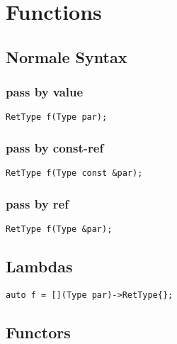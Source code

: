 \section{Functions}
\label{Function}

\subsection{Normale Syntax}
\subsubsection{pass by value}
\begin{lstlisting}
RetType f(Type par);
\end{lstlisting}
\subsubsection{pass by const-ref}
\begin{lstlisting}
RetType f(Type const &par);
\end{lstlisting}
\subsubsection{pass by ref}
\begin{lstlisting}
RetType f(Type &par);
\end{lstlisting}

\subsection{Lambdas}
\label{Lambda}
\begin{lstlisting}
auto f = [](Type par)->RetType{};
\end{lstlisting}

\subsection{Functors}

